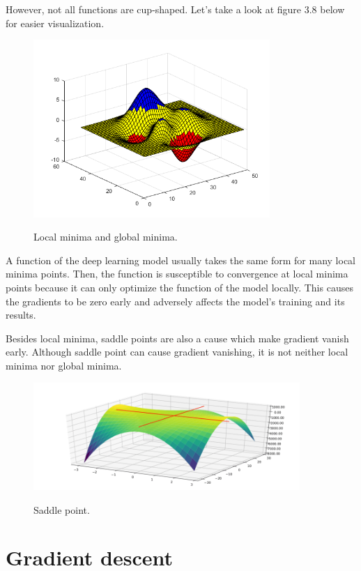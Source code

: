 	However, not all functions are cup-shaped. Let's take a look at figure 3.8 below for easier visualization.
	
	\begin{figure}[H]
		\centering
		{\includegraphics[width=0.8\textwidth]{./hinhanh/chap3/global.png}}
		\caption{Local minima and global minima.}
	\end{figure}
	
	A function of the deep learning model usually takes the same form for many local minima points. Then, the function is susceptible to convergence at local minima points because it can only optimize the function of the model locally. This causes the gradients to be zero early and adversely affects the model's training and its results.
	
	Besides local minima, saddle points are also a cause which make gradient vanish early. Although saddle point can cause gradient vanishing, it is not neither local minima nor global minima. 
	
	\begin{figure}[H]
		\centering
		{\includegraphics[width=0.9\textwidth]{./hinhanh/chap3/saddle.png}}
		\caption{Saddle point.}
	\end{figure}
	
	
\section{Gradient descent}
	\noindent
	
